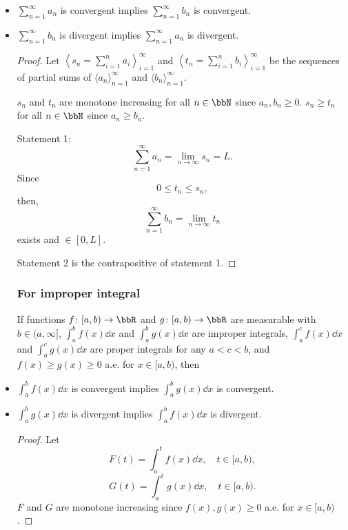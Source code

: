 \documentclass[a4paper,12pt]{report}
\begin{document}
\begin{itemize}
\begin{itemize}
Assume for contradiction that there exists $\varepsilon>0$ and $M\geq a$ such that
\[\forall x\geq M:\,f^-(x)>\varepsilon.\]
Then, $\int_M^{\infty}f^-(x)$ diverges.
\epr
\subsection{(Direct) comparison (test) (theorem)}
\subsubsection{For real series}
If real sequences $\langle a_n\rangle_{n=1}^{\infty}$ and $\langle b_n\rangle_{n=1}^{\infty}$ are such that $a_n\geq b_n\geq 0$ for all $n\in\bbN$, then
\ben
\item $\sum_{n=1}^{\infty}a_n$ is convergent implies $\sum_{n=1}^{\infty}b_n$ is convergent.
\item $\sum_{n=1}^{\infty}b_n$ is divergent implies $\sum_{n=1}^{\infty}a_n$ is divergent.
\een
\begin{proof}
Let $\left\langle s_n=\sum_{i=1}^na_i\right\rangle_{i=1}^{\infty}$ and $\left\langle t_n=\sum_{i=1}^nb_i\right\rangle_{i=1}^{\infty}$ be the sequences of partial sums of $\langle a_n\rangle_{n=1}^{\infty}$ and $\langle b_n\rangle_{n=1}^{\infty}$.

$s_n$ and $t_n$ are monotone increasing for all $n\in\bbN$ since $a_n,b_n\geq 0$. $s_n\geq t_n$ for all $n\in\bbN$ since $a_n\geq b_n$.

Statement 1:
\[\sum_{n=1}^{\infty}a_n=\lim_{n\to\infty}s_n=L.\]
Since
\[0\leq t_n\leq s_n,\]
then,
\[\sum_{n=1}^{\infty}b_n=\lim_{n\to\infty}t_n\]
exists and $\in[0,L]$.

Statement 2 is the contrapositive of statement 1.
\end{proof}
\subsubsection{For improper integral}
If functions $f\colon [a,b)\to\bbR$ and $g\colon [a,b)\to\bbR$ are measurable with $b\in(a,\infty]$, $\int_a^bf(x)\dd{x}$ and $\int_a^bg(x)\dd{x}$ are improper integrals, $\int_a^cf(x)\dd{x}$ and $\int_a^cg(x)\dd{x}$ are proper integrals for any $a<c<b$,
and $f(x)\geq g(x)\geq 0$ a.e. for $x\in[a,b)$, then
\ben
\item $\int_a^bf(x)\dd{x}$ is convergent implies $\int_a^bg(x)\dd{x}$ is convergent.
\item $\int_a^bg(x)\dd{x}$ is divergent implies $\int_a^bf(x)\dd{x}$ is divergent.
\een
\begin{proof}
Let
\[F(t)=\int_a^tf(x)\dd{x},\quad t\in[a,b),\]
\[G(t)=\int_a^tg(x)\dd{x},\quad t\in[a,b).\]
$F$ and $G$ are monotone increasing since $f(x),g(x)\geq 0$ a.e. for $x\in[a,b)$.


\end{proof}
\end{itemize}
\end{itemize}
\end{document}

